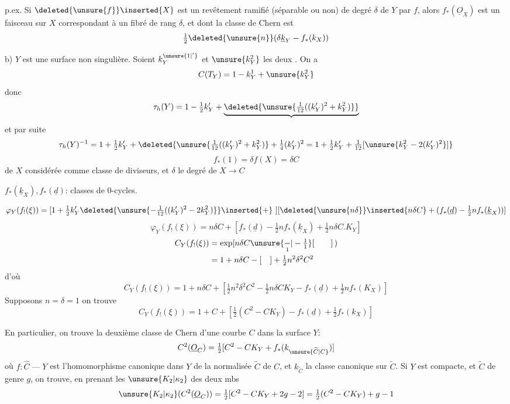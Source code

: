 p.ex. Si \(\deleted{\unsure{f}}\inserted{X}\) est un revêtement ramifié (séparable ou non) de degré \(\delta\) de \(Y\) par \(f\), alors \(f_*(\underline O_X)\) est un  faisceau sur \(X\) correspondant à un fibré  de  rang \(\delta\), et dont la classe de Chern est
\[
\tfrac12\deleted{\unsure{n}}(\delta\underline k_Y-f_*(k_X))
\]

b) \(Y\) est une surface non singulière. Soient \(k_Y^{\unsure{1|' }}\) et \(\unsure{k_Y^2}\) les deux  . On a
\[
C(T_Y)=1-k_Y^1+\unsure{k_Y^2}
\]
donc
\[
\tau_h(Y)=1-\tfrac12k'_Y+\underbrace{\deleted{\unsure{\tfrac1{12}((k'_Y)^2+k_Y^2)}}}
\]
et par suite
\[
\tau_h(Y)^{-1}=1+\tfrac12k'_Y+\deleted{\unsure{\tfrac1{12}((k'_Y)^2+k_Y^2)}+\tfrac14(k'_Y)^2=1+\tfrac12k'_Y+\tfrac1{12}[\unsure{k_Y^2-2(k'_Y)^2}]}
\]
\[
f_*(1)=\delta f(X)=\delta C
\]
 de \(X\) considérée comme classe de diviseurs, et \(\delta\) le degré de \(X\to C\)

\(f_*(\underline k_X),f_*(\underline d)\): classes de \(0\)-cycles.

\[
\varphi_Y(f_!(\xi))=[1+\tfrac12k'_Y\deleted{\unsure{-\tfrac1{12}((k'_Y)^2-2k_Y^2)}}\inserted{+}\ ][\deleted{\unsure{n\delta}}\inserted{n\delta C}+(f_*(\underline d)-\tfrac12n f_*(\underline k_X))]
\]
\[
\boxed{\varphi_Y(f_!(\xi))=n\delta C+\left[f_*(\underline d)-\tfrac12n f_*(\underline k_X)+\tfrac12n\delta C.K_Y\right]}
\]
\[
\begin{aligned}
C_Y(f_!(\xi))&=\exp[n\delta C\unsure{\underset{1}{-}|-\tfrac11}[\qquad]\,)\\
&=1+n\delta C-[\quad]+\tfrac12n^2\delta^2C^2
\end{aligned}
\]
d'où
\[
\boxed{C_Y(f_!(\xi))=1+n\delta C+\left[\tfrac12n^2\delta^2C^2-\tfrac12n\delta C K_Y-f_*(\underline d)+\tfrac12n f_*(K_X)\right]}
\]
Supposons \(n=\delta=1\)  on trouve
\[
C_Y(f_!(\xi))=1+C+\left[\tfrac12(C^2-CK_Y)-f_*(\underline d)+\tfrac12f_*(k_X)\right]
\]


En particulier, on trouve la deuxième classe de Chern d'une courbe \(C\) dans la surface \(Y\):
\[
C^2(\underline O_C)=\tfrac12[C^2-CK_Y+f_*(k_{\unsure{\widetilde C|C}})]
\]
où \(f:\widehat C\mathbin{\text{---}}Y\) est l'homomorphisme canonique dans \(Y\) de la normalisée \(\widetilde C\) de \(C\), et \(k_{\widetilde C}\) la classe canonique sur \(\widetilde C\). Si \(Y\) est compacte, et \(\widetilde C\) de genre \(g\), on trouve, en prenant les \(\unsure{K_2|\kappa_2}\) des deux mbs
\[
\unsure{K_2|\kappa_2}(C^2(\underline O_C))=\tfrac12[C^2-CK_Y+2g-2]=\tfrac12(C^2-CK_Y)+g-1
\]

